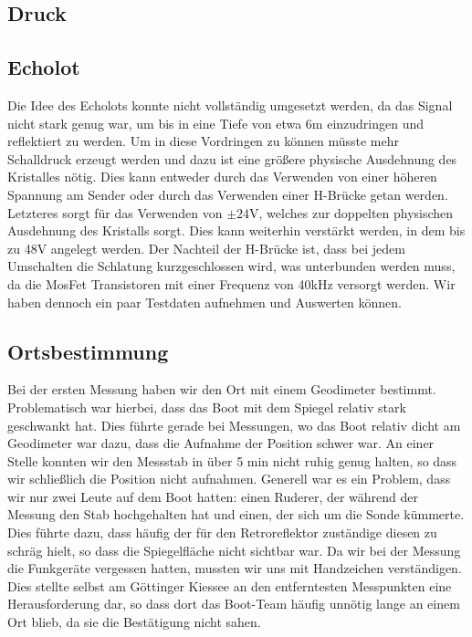 \documentclass[12pt,a4paper,titlepage,headinclude,bibtotoc]{scrartcl}
\begin{document}
\subsection{Druck}


\subsection{Echolot}
Die Idee des Echolots konnte nicht vollständig umgesetzt werden, da das Signal nicht stark genug war, um bis in eine Tiefe von etwa 6\si{\meter} einzudringen und reflektiert zu werden.
Um in diese Vordringen zu können müsste mehr Schalldruck erzeugt werden und dazu ist eine größere physische Ausdehnung des Kristalles nötig.
Dies kann entweder durch das Verwenden von einer höheren Spannung am Sender oder durch das Verwenden einer H-Brücke getan werden.
Letzteres sorgt für das Verwenden von $\pm24\si{\volt}$, welches zur doppelten physischen Ausdehnung des Kristalls sorgt.
Dies kann weiterhin verstärkt werden, in dem bis zu 48\si{\volt} angelegt werden.
Der Nachteil der H-Brücke ist, dass bei jedem Umschalten die Schlatung kurzgeschlossen wird, was unterbunden werden muss, da die MosFet Transistoren mit einer Frequenz von 40\si{\kilo\hertz} versorgt werden.
Wir haben dennoch ein paar Testdaten aufnehmen und Auswerten können.

\subsection{Ortsbestimmung}
Bei der ersten Messung haben wir den Ort mit einem Geodimeter bestimmt.
Problematisch war hierbei, dass das Boot mit dem Spiegel relativ stark geschwankt hat.
Dies führte gerade bei Messungen, wo das Boot relativ dicht am Geodimeter war dazu, dass die Aufnahme der Position schwer war.
An einer Stelle konnten wir den Messstab in über 5 min nicht ruhig genug halten, so dass wir schließlich die Position nicht aufnahmen.
Generell war es ein Problem, dass wir nur zwei Leute auf dem Boot hatten: einen Ruderer, der während der Messung den Stab hochgehalten hat und einen, der sich um die Sonde kümmerte.
Dies führte dazu, dass häufig der für den Retroreflektor zuständige diesen zu schräg hielt, so dass die Spiegelfläche nicht sichtbar war.
Da wir bei der Messung die Funkgeräte vergessen hatten, mussten wir uns mit Handzeichen verständigen.
Dies stellte selbst am Göttinger Kiessee an den entferntesten Messpunkten eine Herausforderung dar, so dass dort das Boot-Team häufig unnötig lange an einem Ort blieb, da sie die Bestätigung nicht sahen.
\end{document}
